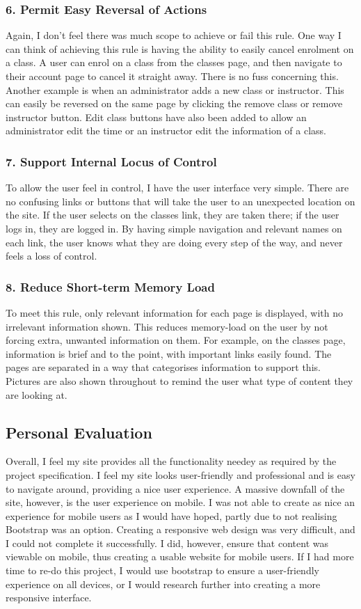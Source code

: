 \documentclass[11pt, article]{article}
\begin{document}
	\subsubsection{6. Permit Easy Reversal of Actions}
	Again, I don't feel there was much scope to achieve or fail this rule. One way I can think of achieving this rule is having the ability to easily cancel enrolment on a class. A user can enrol on a class from the classes page, and then navigate to their account page to cancel it straight away. There is no fuss concerning this. Another example is when an administrator adds a new class or instructor. This can easily be reversed on the same page by clicking the remove class or remove instructor button. Edit class buttons have also been added to allow an administrator edit the time or an instructor edit the information of a class.
	
	\subsubsection{7. Support Internal Locus of Control}
	To allow the user feel in control, I have the user interface very simple. There are no confusing links or buttons that will take the user to an unexpected location on the site. If the user selects on the classes link, they are taken there; if the user logs in, they are logged in. By having simple navigation and relevant names on each link, the user knows what they are doing every step of the way, and never feels a loss of control.
	
	\subsubsection{8. Reduce Short-term Memory Load}
	To meet this rule, only relevant information for each page is displayed, with no irrelevant information shown. This reduces memory-load on the user by not forcing extra, unwanted information on them. For example, on the classes page, information is brief and to the point, with important links easily found. The pages are separated in a way that categorises information to support this. Pictures are also shown throughout to remind the user what type of content they are looking at. 
	
		\subsection{Personal Evaluation}
	Overall, I feel my site provides all the functionality needey as required by the project specification. I feel my site looks user-friendly and professional and is easy to navigate around, providing a nice user experience. A massive downfall of the site, however, is the user experience on mobile. I was not able to create as nice an experience for mobile users as I would have hoped, partly due to not realising Bootstrap was an option. Creating a responsive web design was very difficult, and I could not complete it successfully. I did, however, ensure that content was viewable on mobile, thus creating a usable website for mobile users. If I had more time to re-do this project, I would use bootstrap to ensure a user-friendly experience on all devices, or I would research further into creating a more responsive interface.
\end{document}
